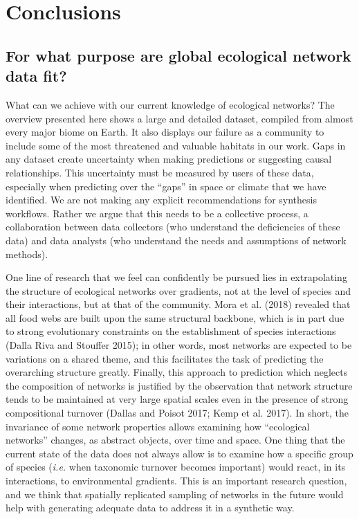 \documentclass[11pt]{article}
\begin{document}
\hypertarget{conclusions}{%
\section{Conclusions}\label{conclusions}}

\hypertarget{for-what-purpose-are-global-ecological-network-data-fit}{%
\subsection{For what purpose are global ecological network data
fit?}\label{for-what-purpose-are-global-ecological-network-data-fit}}

What can we achieve with our current knowledge of ecological networks?
The overview presented here shows a large and detailed dataset, compiled
from almost every major biome on Earth. It also displays our failure as
a community to include some of the most threatened and valuable habitats
in our work. Gaps in any dataset create uncertainty when making
predictions or suggesting causal relationships. This uncertainty must be
measured by users of these data, especially when predicting over the
``gaps'' in space or climate that we have identified. We are not making
any explicit recommendations for synthesis workflows. Rather we argue
that this needs to be a collective process, a collaboration between data
collectors (who understand the deficiencies of these data) and data
analysts (who understand the needs and assumptions of network methods).

One line of research that we feel can confidently be pursued lies in
extrapolating the structure of ecological networks over gradients, not
at the level of species and their interactions, but at that of the
community. Mora et al. (2018) revealed that all food webs are built upon
the same structural backbone, which is in part due to strong
evolutionary constraints on the establishment of species interactions
(Dalla Riva and Stouffer 2015); in other words, most networks are
expected to be variations on a shared theme, and this facilitates the
task of predicting the overarching structure greatly. Finally, this
approach to prediction which neglects the composition of networks is
justified by the observation that network structure tends to be
maintained at very large spatial scales even in the presence of strong
compositional turnover (Dallas and Poisot 2017; Kemp et al. 2017). In
short, the invariance of some network properties allows examining how
``ecological networks'' changes, as abstract objects, over time and
space. One thing that the current state of the data does not always
allow is to examine how a specific group of species (\emph{i.e.} when
taxonomic turnover becomes important) would react, in its interactions,
to environmental gradients. This is an important research question, and
we think that spatially replicated sampling of networks in the future
would help with generating adequate data to address it in a synthetic
way.
\end{document}
